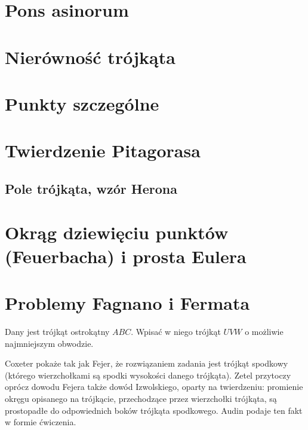 

\section{Pons asinorum}


\section{Nierówność trójkąta}


\section{Punkty szczególne}


\section{Twierdzenie Pitagorasa}


\subsection{Pole trójkąta, wzór Herona}


\section{Okrąg dziewięciu punktów (Feuerbacha) i prosta Eulera}


\section{Problemy Fagnano i Fermata}

\begin{problem}
	Dany jest trójkąt ostrokątny $ABC$.
	Wpisać w niego trójkąt $UVW$ o możliwie najmniejszym obwodzie.
%
\end{problem}

Coxeter \cite[s. 36, 37]{coxeter_1967} pokaże tak jak Fejer, że rozwiązaniem zadania jest trójkąt spodkowy (którego wierzchołkami są spodki wysokości danego trójkąta).
Zetel \cite[s. 97-100]{zetel_2020} przytoczy oprócz dowodu Fejera także dowód Izwolskiego, oparty na twierdzeniu: promienie okręgu opisanego na trójkącie, przechodzące przez wierzchołki trójkąta, są prostopadłe do odpowiednich boków trójkąta spodkowego.
Audin \cite[s. 101]{audin_2003} podaje ten fakt w formie ćwiczenia. %

